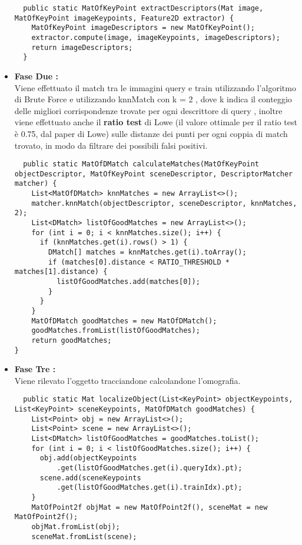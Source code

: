 \begin{itemize}
\begin{lstlisting}
  public static MatOfKeyPoint extractDescriptors(Mat image, MatOfKeyPoint imageKeypoints, Feature2D extractor) {
    MatOfKeyPoint imageDescriptors = new MatOfKeyPoint();
    extractor.compute(image, imageKeypoints, imageDescriptors);
    return imageDescriptors;
  }
\end{lstlisting}
\item \textbf{Fase Due :}\\
Viene effettuato il match tra le immagini query e train utilizzando l'algoritmo di Brute Force e utilizzando knnMatch con k = 2 , dove k indica il conteggio delle migliori corrispondenze trovate per ogni descrittore di query , inoltre viene effettuato anche il \textbf{ratio test} di Lowe (il valore ottimale per il ratio test è 0.75, dal paper di Lowe) sulle distanze dei punti per ogni coppia di match trovato, in modo da filtrare dei possibili falsi positivi.
\begin{lstlisting}
  public static MatOfDMatch calculateMatches(MatOfKeyPoint objectDescriptor, MatOfKeyPoint sceneDescriptor, DescriptorMatcher matcher) {
    List<MatOfDMatch> knnMatches = new ArrayList<>();
    matcher.knnMatch(objectDescriptor, sceneDescriptor, knnMatches, 2);
    List<DMatch> listOfGoodMatches = new ArrayList<>();
    for (int i = 0; i < knnMatches.size(); i++) {
      if (knnMatches.get(i).rows() > 1) {
        DMatch[] matches = knnMatches.get(i).toArray();
        if (matches[0].distance < RATIO_THRESHOLD * matches[1].distance) {
          listOfGoodMatches.add(matches[0]);
        }
      }
    }
    MatOfDMatch goodMatches = new MatOfDMatch();
    goodMatches.fromList(listOfGoodMatches);
    return goodMatches;
}
\end{lstlisting}
\item \textbf{Fase Tre :}\\
Viene rilevato l'oggetto tracciandone calcolandone l'omografia.
\begin{lstlisting}
  public static Mat localizeObject(List<KeyPoint> objectKeypoints, List<KeyPoint> sceneKeypoints, MatOfDMatch goodMatches) {
    List<Point> obj = new ArrayList<>();
    List<Point> scene = new ArrayList<>();
    List<DMatch> listOfGoodMatches = goodMatches.toList();
    for (int i = 0; i < listOfGoodMatches.size(); i++) {
      obj.add(objectKeypoints
          .get(listOfGoodMatches.get(i).queryIdx).pt);
      scene.add(sceneKeypoints
          .get(listOfGoodMatches.get(i).trainIdx).pt);
    }
    MatOfPoint2f objMat = new MatOfPoint2f(), sceneMat = new MatOfPoint2f();
    objMat.fromList(obj);
    sceneMat.fromList(scene);

\end{lstlisting}
\end{itemize}
